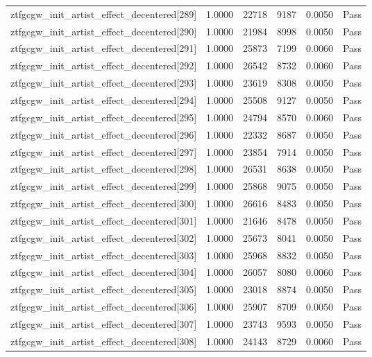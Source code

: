 \begin{table}[htbp]
\begin{tabular}{llrrll}
ztfgcgw\_init\_artist\_effect\_decentered[289] & 1.0000 & 22718 & 9187 & 0.0050 & Pass \\
ztfgcgw\_init\_artist\_effect\_decentered[290] & 1.0000 & 21984 & 8998 & 0.0050 & Pass \\
ztfgcgw\_init\_artist\_effect\_decentered[291] & 1.0000 & 25873 & 7199 & 0.0060 & Pass \\
ztfgcgw\_init\_artist\_effect\_decentered[292] & 1.0000 & 26542 & 8732 & 0.0060 & Pass \\
ztfgcgw\_init\_artist\_effect\_decentered[293] & 1.0000 & 23619 & 8308 & 0.0050 & Pass \\
ztfgcgw\_init\_artist\_effect\_decentered[294] & 1.0000 & 25508 & 9127 & 0.0050 & Pass \\
ztfgcgw\_init\_artist\_effect\_decentered[295] & 1.0000 & 24794 & 8570 & 0.0060 & Pass \\
ztfgcgw\_init\_artist\_effect\_decentered[296] & 1.0000 & 22332 & 8687 & 0.0050 & Pass \\
ztfgcgw\_init\_artist\_effect\_decentered[297] & 1.0000 & 23854 & 7914 & 0.0050 & Pass \\
ztfgcgw\_init\_artist\_effect\_decentered[298] & 1.0000 & 26531 & 8638 & 0.0050 & Pass \\
ztfgcgw\_init\_artist\_effect\_decentered[299] & 1.0000 & 25868 & 9075 & 0.0050 & Pass \\
ztfgcgw\_init\_artist\_effect\_decentered[300] & 1.0000 & 26616 & 8483 & 0.0050 & Pass \\
ztfgcgw\_init\_artist\_effect\_decentered[301] & 1.0000 & 21646 & 8478 & 0.0050 & Pass \\
ztfgcgw\_init\_artist\_effect\_decentered[302] & 1.0000 & 25673 & 8041 & 0.0050 & Pass \\
ztfgcgw\_init\_artist\_effect\_decentered[303] & 1.0000 & 25968 & 8832 & 0.0050 & Pass \\
ztfgcgw\_init\_artist\_effect\_decentered[304] & 1.0000 & 26057 & 8080 & 0.0060 & Pass \\
ztfgcgw\_init\_artist\_effect\_decentered[305] & 1.0000 & 23018 & 8874 & 0.0050 & Pass \\
ztfgcgw\_init\_artist\_effect\_decentered[306] & 1.0000 & 25907 & 8709 & 0.0050 & Pass \\
ztfgcgw\_init\_artist\_effect\_decentered[307] & 1.0000 & 23743 & 9593 & 0.0050 & Pass \\
ztfgcgw\_init\_artist\_effect\_decentered[308] & 1.0000 & 24143 & 8729 & 0.0060 & Pass \\

\end{tabular}
\end{table}
